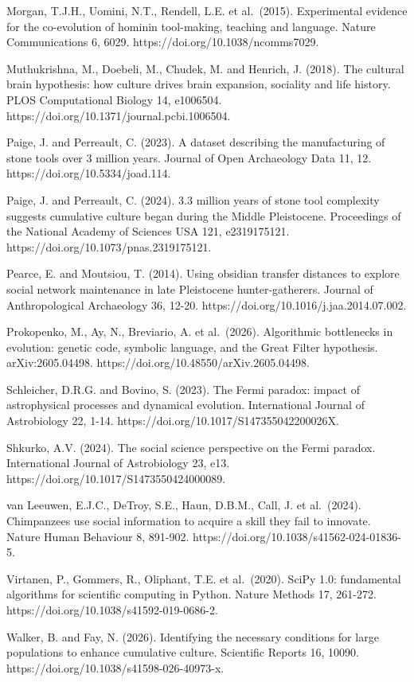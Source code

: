 \documentclass[
  10pt,a4paper,
]{article}
\begin{document}
Morgan, T.J.H., Uomini, N.T., Rendell, L.E. et al.~(2015). Experimental
evidence for the co-evolution of hominin tool-making, teaching and
language. Nature Communications 6, 6029.
https://doi.org/10.1038/ncomms7029.

Muthukrishna, M., Doebeli, M., Chudek, M. and Henrich, J. (2018). The
cultural brain hypothesis: how culture drives brain expansion, sociality
and life history. PLOS Computational Biology 14, e1006504.
https://doi.org/10.1371/journal.pcbi.1006504.

Paige, J. and Perreault, C. (2023). A dataset describing the
manufacturing of stone tools over 3 million years. Journal of Open
Archaeology Data 11, 12. https://doi.org/10.5334/joad.114.

Paige, J. and Perreault, C. (2024). 3.3 million years of stone tool
complexity suggests cumulative culture began during the Middle
Pleistocene. Proceedings of the National Academy of Sciences USA 121,
e2319175121. https://doi.org/10.1073/pnas.2319175121.

Pearce, E. and Moutsiou, T. (2014). Using obsidian transfer distances to
explore social network maintenance in late Pleistocene hunter-gatherers.
Journal of Anthropological Archaeology 36, 12-20.
https://doi.org/10.1016/j.jaa.2014.07.002.

Prokopenko, M., Ay, N., Breviario, A. et al.~(2026). Algorithmic
bottlenecks in evolution: genetic code, symbolic language, and the Great
Filter hypothesis. arXiv:2605.04498.
https://doi.org/10.48550/arXiv.2605.04498.

Schleicher, D.R.G. and Bovino, S. (2023). The Fermi paradox: impact of
astrophysical processes and dynamical evolution. International Journal
of Astrobiology 22, 1-14. https://doi.org/10.1017/S147355042200026X.

Shkurko, A.V. (2024). The social science perspective on the Fermi
paradox. International Journal of Astrobiology 23, e13.
https://doi.org/10.1017/S1473550424000089.

van Leeuwen, E.J.C., DeTroy, S.E., Haun, D.B.M., Call, J. et al.~(2024).
Chimpanzees use social information to acquire a skill they fail to
innovate. Nature Human Behaviour 8, 891-902.
https://doi.org/10.1038/s41562-024-01836-5.

Virtanen, P., Gommers, R., Oliphant, T.E. et al.~(2020). SciPy 1.0:
fundamental algorithms for scientific computing in Python. Nature
Methods 17, 261-272. https://doi.org/10.1038/s41592-019-0686-2.

Walker, B. and Fay, N. (2026). Identifying the necessary conditions for
large populations to enhance cumulative culture. Scientific Reports 16,
10090. https://doi.org/10.1038/s41598-026-40973-x.
\end{document}
